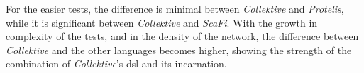 For the easier tests, the difference is minimal between \emph{Collektive} and \emph{Protelis}, while it is significant
between \emph{Collektive} and \emph{ScaFi}.
With the growth in complexity of the tests, and in the density of the network, the difference between \emph{Collektive}
and the other languages becomes higher, showing the strength of the combination of \emph{Collektive}'s \ac{dsl} and its incarnation.

